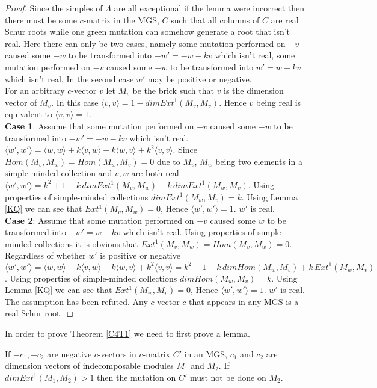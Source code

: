 \begin{proof}
\indent Since the simples of $\Lambda$ are all exceptional if the lemma were incorrect then there must be some $c$-matrix in the MGS, $C$ such that all columns of $C$ are real Schur roots while one green mutation can somehow generate a root that isn't real. Here there can only be two cases, namely some mutation performed on $-v$ caused some $-w$ to be transformed into $-w'=-w-kv$ which isn't real, some mutation performed on $-v$ caused some $+w$ to be transformed into $w'=w-kv$ which isn't real. In the second case $w'$ may be positive or negative.\\
\indent For an arbitrary $c$-vector $v$ let $M_v$ be the brick such that $v$ is the dimension vector of $M_v$. In this case $\langle v,v\rangle=1-dim Ext^1(M_v,M_v)$. Hence $v$ being real is equivalent to $\langle v,v\rangle=1$.\\
\indent \textbf{Case 1}: Assume that some mutation performed on $-v$ caused some $-w$ to be transformed into $-w'=-w-kv$ which isn't real. $\langle w', w'\rangle = \langle w, w\rangle + k\langle v,w\rangle + k\langle w,v\rangle + k^2\langle v,v\rangle$. Since $Hom(M_v, M_w) = Hom(M_w, M_v) = 0$ due to $M_v$, $M_w$ being two elements in a simple-minded collection and $v, w$ are both real  $\langle w', w'\rangle = k^2+1-k\, dim Ext^1(M_v, M_w) - k\, dim Ext^1(M_w, M_v)$. Using properties of simple-minded collections $dim Ext^1(M_w, M_v)  = k$. Using Lemma \ref{KQ} we can see that $Ext^1(M_v, M_w)  = 0$, Hence $\langle w', w'\rangle = 1$. $w'$ is real.\\
\indent \textbf{Case 2}: Assume that some mutation performed on $-v$ caused some $w$ to be transformed into $-w'=w-kv$ which isn't real. Using properties of simple-minded collections it is obvious that $Ext^1(M_v, M_w) = Hom(M_v, M_w) = 0$. Regardless of whether $w'$ is positive or negative $\langle w', w'\rangle = \langle w, w\rangle - k\langle v,w\rangle - k\langle w,v\rangle + k^2\langle v,v\rangle = k^2+1 -k\,dim Hom(M_w, M_v) + k\,Ext^1(M_w, M_v)$. Using properties of simple-minded collections $dim Hom(M_w, M_v)  = k$. Using Lemma \ref{KQ} we can see that $Ext^1(M_w, M_v)  = 0$, Hence $\langle w', w'\rangle = 1$. $w'$ is real.\\
\indent The assumption has been refuted. Any $c$-vector $c$ that appears in any MGS is a real Schur root.
\end{proof}
\indent In order to prove Theorem \ref{C4T1} we need to first prove a lemma.
\begin{lemma}\label{C4L}
\indent If $-c_1, -c_2$ are negative $c$-vectors in $c$-matrix $C'$ in an MGS, $c_1$ and $c_2$ are dimension vectors of indecomposable modules $M_1$ and $M_2$. If $dim Ext^1(M_1, M_2) > 1$ then the mutation on $C'$ must not be done on $M_2$.
\end{lemma}
